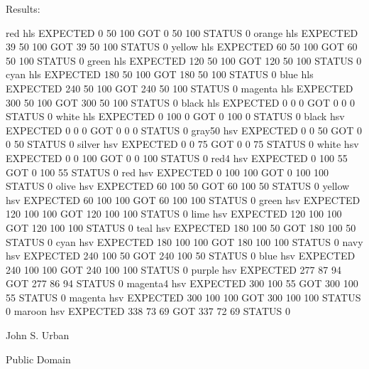 \begin{DoxyDescription}
\begin{DoxyPre}   Results:\end{DoxyPre}



\begin{DoxyPre}     red       hls EXPECTED   0  50 100 GOT   0  50 100 STATUS 0
     orange    hls EXPECTED  39  50 100 GOT  39  50 100 STATUS 0
     yellow    hls EXPECTED  60  50 100 GOT  60  50 100 STATUS 0
     green     hls EXPECTED 120  50 100 GOT 120  50 100 STATUS 0
     cyan      hls EXPECTED 180  50 100 GOT 180  50 100 STATUS 0
     blue      hls EXPECTED 240  50 100 GOT 240  50 100 STATUS 0
     magenta   hls EXPECTED 300  50 100 GOT 300  50 100 STATUS 0
     black     hls EXPECTED   0   0   0 GOT   0   0   0 STATUS 0
     white     hls EXPECTED   0 100   0 GOT   0 100   0 STATUS 0
     black     hsv EXPECTED   0   0   0 GOT   0   0   0 STATUS 0
     gray50    hsv EXPECTED   0   0  50 GOT   0   0  50 STATUS 0
     silver    hsv EXPECTED   0   0  75 GOT   0   0  75 STATUS 0
     white     hsv EXPECTED   0   0 100 GOT   0   0 100 STATUS 0
     red4      hsv EXPECTED   0 100  55 GOT   0 100  55 STATUS 0
     red       hsv EXPECTED   0 100 100 GOT   0 100 100 STATUS 0
     olive     hsv EXPECTED  60 100  50 GOT  60 100  50 STATUS 0
     yellow    hsv EXPECTED  60 100 100 GOT  60 100 100 STATUS 0
     green     hsv EXPECTED 120 100 100 GOT 120 100 100 STATUS 0
     lime      hsv EXPECTED 120 100 100 GOT 120 100 100 STATUS 0
     teal      hsv EXPECTED 180 100  50 GOT 180 100  50 STATUS 0
     cyan      hsv EXPECTED 180 100 100 GOT 180 100 100 STATUS 0
     navy      hsv EXPECTED 240 100  50 GOT 240 100  50 STATUS 0
     blue      hsv EXPECTED 240 100 100 GOT 240 100 100 STATUS 0
     purple    hsv EXPECTED 277  87  94 GOT 277  86  94 STATUS 0
     magenta4  hsv EXPECTED 300 100  55 GOT 300 100  55 STATUS 0
     magenta   hsv EXPECTED 300 100 100 GOT 300 100 100 STATUS 0
     maroon    hsv EXPECTED 338  73  69 GOT 337  72  69 STATUS 0
 \end{DoxyPre}
 


\item[A\+U\+T\+H\+OR ]

John S. Urban




\item[L\+I\+C\+E\+N\+SE ]

Public Domain




\end{DoxyDescription}

